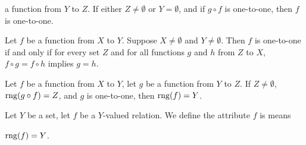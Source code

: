 \documentclass{article}
\begin{document}
\begin{thm}
  a function from $Y$ to $Z$. If either $Z\neq\emptyset$ or $Y=\emptyset$,
  and if $g\circ f$ is one-to-one, then $f$ is one-to-one.
\item\label{funct2:21} Let $f$ be a function from $X$ to $Y$. Suppose
  $X\neq\emptyset$ and $Y\neq\emptyset$.
  Then $f$ is one-to-one if and only if for every set $Z$ and for all
  functions $g$ and $h$ from $Z$ to $X$, $f\circ g=f\circ h$ implies $g=h$.
\item\label{funct2:22} Let $f$ be a function from $X$ to $Y$,
  let $g$ be a function from $Y$ to $Z$. If $Z\neq\emptyset$,
  $\operatorname{rng}(g\circ f)=Z$, and $g$ is one-to-one, then $\operatorname{rng}(f)=Y$.
\end{thm}

\begin{definition}
Let $Y$ be a set, let $f$ be a $Y$-valued relation.
We define the attribute $f$ is  means
\begin{defn}
\item $\operatorname{rng}(f)=Y$.
\end{defn}
\end{definition}
\end{document}
